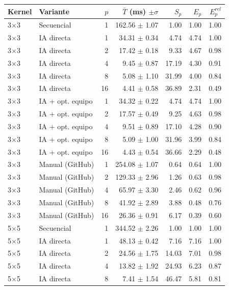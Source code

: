 \begin{tabular}{llrrrrr}
\toprule
Kernel & Variante & $p$ & $\bar{T}$ (ms) $\pm\sigma$ & $S_p$ & $E_p$ & $E^{rel}_p$ \\
\midrule
3$\times$3 & Secuencial & 1 & 162.56 $\pm$ 1.07 & 1.00 & 1.00 & 1.00 \\
3$\times$3 & IA directa & 1 & 34.31 $\pm$ 0.34 & 4.74 & 4.74 & 1.00 \\
3$\times$3 & IA directa & 2 & 17.42 $\pm$ 0.18 & 9.33 & 4.67 & 0.98 \\
3$\times$3 & IA directa & 4 & 9.45 $\pm$ 0.87 & 17.19 & 4.30 & 0.91 \\
3$\times$3 & IA directa & 8 & 5.08 $\pm$ 1.10 & 31.99 & 4.00 & 0.84 \\
3$\times$3 & IA directa & 16 & 4.41 $\pm$ 0.58 & 36.89 & 2.31 & 0.49 \\
3$\times$3 & IA + opt. equipo & 1 & 34.32 $\pm$ 0.22 & 4.74 & 4.74 & 1.00 \\
3$\times$3 & IA + opt. equipo & 2 & 17.57 $\pm$ 0.49 & 9.25 & 4.63 & 0.98 \\
3$\times$3 & IA + opt. equipo & 4 & 9.51 $\pm$ 0.89 & 17.10 & 4.28 & 0.90 \\
3$\times$3 & IA + opt. equipo & 8 & 5.09 $\pm$ 1.00 & 31.96 & 3.99 & 0.84 \\
3$\times$3 & IA + opt. equipo & 16 & 4.43 $\pm$ 0.54 & 36.66 & 2.29 & 0.48 \\
3$\times$3 & Manual (GitHub) & 1 & 254.08 $\pm$ 1.07 & 0.64 & 0.64 & 1.00 \\
3$\times$3 & Manual (GitHub) & 2 & 129.33 $\pm$ 2.96 & 1.26 & 0.63 & 0.98 \\
3$\times$3 & Manual (GitHub) & 4 & 65.97 $\pm$ 3.30 & 2.46 & 0.62 & 0.96 \\
3$\times$3 & Manual (GitHub) & 8 & 41.92 $\pm$ 2.89 & 3.88 & 0.48 & 0.76 \\
3$\times$3 & Manual (GitHub) & 16 & 26.36 $\pm$ 0.91 & 6.17 & 0.39 & 0.60 \\
\midrule
5$\times$5 & Secuencial & 1 & 344.52 $\pm$ 2.26 & 1.00 & 1.00 & 1.00 \\
5$\times$5 & IA directa & 1 & 48.13 $\pm$ 0.42 & 7.16 & 7.16 & 1.00 \\
5$\times$5 & IA directa & 2 & 24.56 $\pm$ 1.75 & 14.03 & 7.01 & 0.98 \\
5$\times$5 & IA directa & 4 & 13.82 $\pm$ 1.92 & 24.93 & 6.23 & 0.87 \\
5$\times$5 & IA directa & 8 & 7.41 $\pm$ 1.54 & 46.47 & 5.81 & 0.81 \\

\end{tabular}
